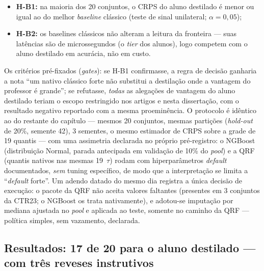 \begin{itemize}
  \item \textbf{H-B1:} na maioria dos 20 conjuntos, o CRPS do aluno
    destilado é menor ou igual ao do melhor \emph{baseline} clássico (teste
    de sinal unilateral; $\alpha = 0{,}05$);
  \item \textbf{H-B2:} os baselines clássicos não alteram a leitura da
    fronteira --- suas latências são de microssegundos (o \emph{tier} dos
    alunos), logo competem com o aluno destilado em acurácia, não em
    custo.
\end{itemize}

Os critérios pré-fixados (\emph{gates}): se H-B1 confirmasse, a regra de decisão ganharia a nota ``um
nativo clássico forte não substitui a destilação onde a vantagem do
professor é grande''; se refutasse, \emph{todas} as alegações de vantagem
do aluno destilado teriam o escopo restringido nos artigos e nesta dissertação,
com o resultado negativo reportado com a mesma proeminência. O
protocolo é idêntico ao do restante do capítulo --- mesmos 20
conjuntos, mesmas partições (\emph{hold-out} de 20\%, semente 42), 3 sementes, o
mesmo estimador de CRPS sobre a grade de 19 quantis --- com uma
assimetria declarada no próprio pré-registro: o NGBoost (distribuição
Normal, parada antecipada em validação de 10\% do \emph{pool}) e a QRF
(quantis nativos nas mesmas 19~$\tau$) rodam com hiperparâmetros
\emph{default} documentados, \emph{sem} tuning específico, de modo que a
interpretação se limita a ``\emph{default} forte''. Um adendo datado do mesmo
dia registra a única decisão de execução: o pacote da QRF não aceita
valores faltantes (presentes em 3 conjuntos da CTR23; o NGBoost os
trata nativamente), e adotou-se imputação por mediana ajustada no \emph{pool}
e aplicada ao teste, somente no caminho da QRF --- política simples,
sem vazamento, declarada.

\subsection[Resultados: 17 de 20, com três reveses
instrutivos]{Resultados: 17 de 20 para o aluno destilado --- com três
reveses instrutivos}
\label{sec:destil-e1-resultados}

